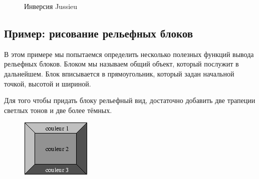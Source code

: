 \begin{figure}[h]
	\caption{\label{fig:inversion_of_Jussieu}Инверсия Jussieu}
\end{figure}

\subsection{Пример: рисование рельефных блоков}
\label{subsec:example_drawing_of_boxes_with_relief_patterns}

В этом примере мы попытаемся определить несколько полезных функций вывода 
рельефных блоков. Блоком мы называем общий объект, который послужит в 
дальнейшем. Блок вписывается в прямоугольник, который задан начальной точкой, 
высотой и шириной.

Для того чтобы придать блоку рельефный вид, достаточно добавить две трапеции 
светлых тонов и две более тёмных.

\begin{figure}[h]
	\includegraphics[scale=0.4]{drafts/book-ora012}
\end{figure}


